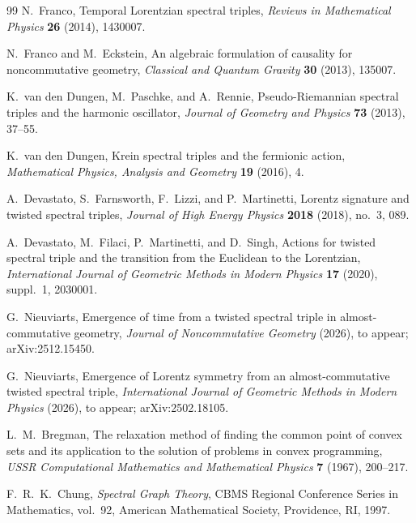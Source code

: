 \documentclass[11pt]{article}
\numberwithin{equation}{section}
\theoremstyle{definition}
\theoremstyle{remark}
\begin{document}
\begin{thebibliography}{99}
N.~Franco,
\newblock Temporal Lorentzian spectral triples,
\newblock \emph{Reviews in Mathematical Physics} \textbf{26} (2014),
1430007.

N.~Franco and M.~Eckstein,
\newblock An algebraic formulation of causality for noncommutative geometry,
\newblock \emph{Classical and Quantum Gravity} \textbf{30} (2013), 135007.

K.~van den Dungen, M.~Paschke, and A.~Rennie,
\newblock Pseudo-Riemannian spectral triples and the harmonic oscillator,
\newblock \emph{Journal of Geometry and Physics} \textbf{73} (2013),
37--55.

K.~van den Dungen,
\newblock Krein spectral triples and the fermionic action,
\newblock \emph{Mathematical Physics, Analysis and Geometry}
\textbf{19} (2016), 4.

A.~Devastato, S.~Farnsworth, F.~Lizzi, and P.~Martinetti,
\newblock Lorentz signature and twisted spectral triples,
\newblock \emph{Journal of High Energy Physics} \textbf{2018} (2018),
no.~3, 089.

A.~Devastato, M.~Filaci, P.~Martinetti, and D.~Singh,
\newblock Actions for twisted spectral triple and the transition from the
Euclidean to the Lorentzian,
\newblock \emph{International Journal of Geometric Methods in Modern Physics}
\textbf{17} (2020), suppl.~1, 2030001.

G.~Nieuviarts,
\newblock Emergence of time from a twisted spectral triple in
almost-commutative geometry,
\newblock \emph{Journal of Noncommutative Geometry} (2026), to appear;
arXiv:2512.15450.

G.~Nieuviarts,
\newblock Emergence of Lorentz symmetry from an almost-commutative twisted
spectral triple,
\newblock \emph{International Journal of Geometric Methods in Modern Physics}
(2026), to appear; arXiv:2502.18105.

L.~M.~Bregman,
\newblock The relaxation method of finding the common point of convex sets and
its application to the solution of problems in convex programming,
\newblock \emph{USSR Computational Mathematics and Mathematical Physics}
\textbf{7} (1967), 200--217.

F.~R.~K.~Chung,
\newblock \emph{Spectral Graph Theory},
\newblock CBMS Regional Conference Series in Mathematics, vol.~92,
American Mathematical Society, Providence, RI, 1997.


\end{thebibliography}
\end{document}
